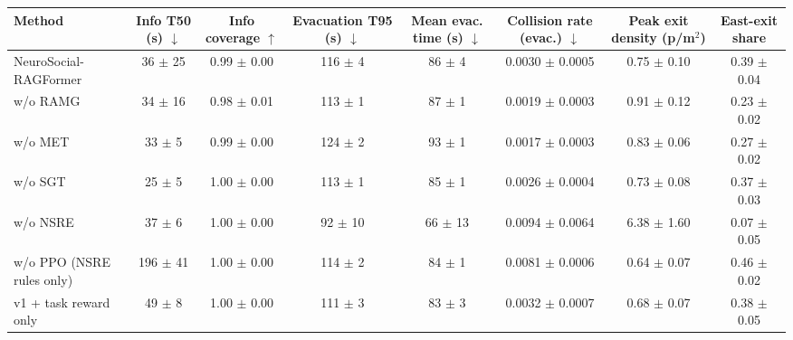 \begin{tabular}{lccccccc}\toprule
Method & Info T50 (s) $\downarrow$ & Info coverage $\uparrow$ & Evacuation T95 (s) $\downarrow$ & Mean evac. time (s) $\downarrow$ & Collision rate (evac.) $\downarrow$ & Peak exit density (p/m$^2$) & East-exit share \\ \midrule
NeuroSocial-RAGFormer & 36 $\pm$ 25 & 0.99 $\pm$ 0.00 & 116 $\pm$ 4 & 86 $\pm$ 4 & 0.0030 $\pm$ 0.0005 & 0.75 $\pm$ 0.10 & 0.39 $\pm$ 0.04 \\
w/o RAMG & 34 $\pm$ 16 & 0.98 $\pm$ 0.01 & 113 $\pm$ 1 & 87 $\pm$ 1 & 0.0019 $\pm$ 0.0003 & 0.91 $\pm$ 0.12 & 0.23 $\pm$ 0.02 \\
w/o MET & 33 $\pm$ 5 & 0.99 $\pm$ 0.00 & 124 $\pm$ 2 & 93 $\pm$ 1 & 0.0017 $\pm$ 0.0003 & 0.83 $\pm$ 0.06 & 0.27 $\pm$ 0.02 \\
w/o SGT & 25 $\pm$ 5 & 1.00 $\pm$ 0.00 & 113 $\pm$ 1 & 85 $\pm$ 1 & 0.0026 $\pm$ 0.0004 & 0.73 $\pm$ 0.08 & 0.37 $\pm$ 0.03 \\
w/o NSRE & 37 $\pm$ 6 & 1.00 $\pm$ 0.00 & 92 $\pm$ 10 & 66 $\pm$ 13 & 0.0094 $\pm$ 0.0064 & 6.38 $\pm$ 1.60 & 0.07 $\pm$ 0.05 \\
w/o PPO (NSRE rules only) & 196 $\pm$ 41 & 1.00 $\pm$ 0.00 & 114 $\pm$ 2 & 84 $\pm$ 1 & 0.0081 $\pm$ 0.0006 & 0.64 $\pm$ 0.07 & 0.46 $\pm$ 0.02 \\
v1 + task reward only & 49 $\pm$ 8 & 1.00 $\pm$ 0.00 & 111 $\pm$ 3 & 83 $\pm$ 3 & 0.0032 $\pm$ 0.0007 & 0.68 $\pm$ 0.07 & 0.38 $\pm$ 0.05 \\
\bottomrule\end{tabular}